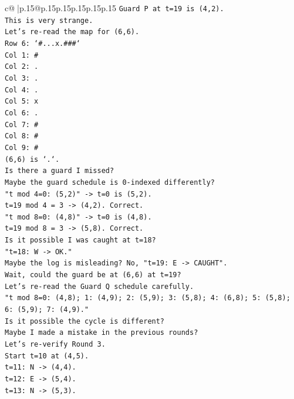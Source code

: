 \documentclass{article}
\begin{document}
{\begin{supertabular}{c@{$\;$}|p{.15\linewidth}@{}p{.15\linewidth}p{.15\linewidth}p{.15\linewidth}p{.15\linewidth}p{.15\linewidth}}
{{{\texttt{Guard P at t=19 is (4,2).} \\
\texttt{This is very strange.} \\
\texttt{Let's re{-}read the map for (6,6).} \\
\texttt{Row 6: `\#...x.\#\#\#`} \\
\texttt{Col 1: \#} \\
\texttt{Col 2: .} \\
\texttt{Col 3: .} \\
\texttt{Col 4: .} \\
\texttt{Col 5: x} \\
\texttt{Col 6: .} \\
\texttt{Col 7: \#} \\
\texttt{Col 8: \#} \\
\texttt{Col 9: \#} \\
\texttt{(6,6) is `.`.} \\
\texttt{Is there a guard I missed?} \\
\texttt{Maybe the guard schedule is 0{-}indexed differently?} \\
\texttt{"t mod 4=0: (5,2)" {-}> t=0 is (5,2).} \\
\texttt{t=19 mod 4 = 3 {-}> (4,2). Correct.} \\
\texttt{"t mod 8=0: (4,8)" {-}> t=0 is (4,8).} \\
\texttt{t=19 mod 8 = 3 {-}> (5,8). Correct.} \\
\texttt{Is it possible I was caught at t=18?} \\
\texttt{"t=18: W {-}> OK."} \\
\texttt{Maybe the log is misleading? No, "t=19: E {-}> CAUGHT".} \\
\texttt{Wait, could the guard be at (6,6) at t=19?} \\
\texttt{Let's re{-}read the Guard Q schedule carefully.} \\
\texttt{"t mod 8=0: (4,8); 1: (4,9); 2: (5,9); 3: (5,8); 4: (6,8); 5: (5,8); 6: (5,9); 7: (4,9)."} \\
\texttt{Is it possible the cycle is different?} \\
\texttt{Maybe I made a mistake in the previous rounds?} \\
\texttt{Let's re{-}verify Round 3.} \\
\texttt{Start t=10 at (4,5).} \\
\texttt{t=11: N {-}> (4,4).} \\
\texttt{t=12: E {-}> (5,4).} \\
\texttt{t=13: N {-}> (5,3).} \\
}}}
\end{supertabular}}
\end{document}
